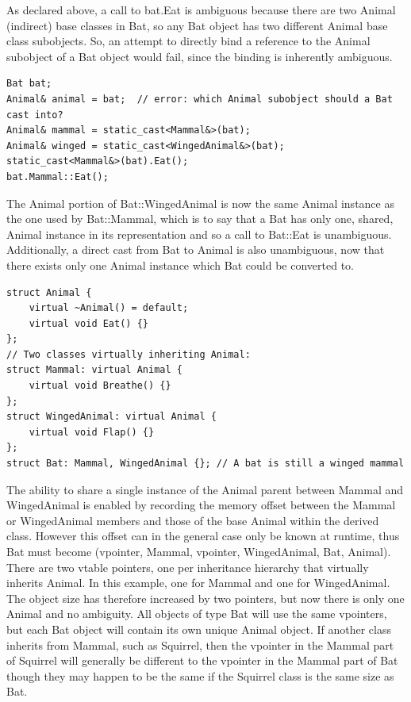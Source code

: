 \documentclass[a4paper,12pt,notitlepage]{article}
\begin{document}
As declared above, a call to bat.Eat is ambiguous because there are two Animal (indirect) base classes in Bat, so any Bat object has two different Animal base class subobjects. So, an attempt to directly bind a reference to the Animal subobject of a Bat object would fail, since the binding is inherently ambiguous.

\begin{verbatim}
Bat bat;
Animal& animal = bat;  // error: which Animal subobject should a Bat cast into?
Animal& mammal = static_cast<Mammal&>(bat); 
Animal& winged = static_cast<WingedAnimal&>(bat);
static_cast<Mammal&>(bat).Eat();
bat.Mammal::Eat();
\end{verbatim}

The Animal portion of Bat::WingedAnimal is now the same Animal instance as the one used by Bat::Mammal, which is to say that a Bat has only one, shared, Animal instance in its representation and so a call to Bat::Eat is unambiguous. Additionally, a direct cast from Bat to Animal is also unambiguous, now that there exists only one Animal instance which Bat could be converted to.

\begin{verbatim}
struct Animal {
    virtual ~Animal() = default;
    virtual void Eat() {}
};
// Two classes virtually inheriting Animal:
struct Mammal: virtual Animal {
    virtual void Breathe() {}
};
struct WingedAnimal: virtual Animal {
    virtual void Flap() {}
};
struct Bat: Mammal, WingedAnimal {}; // A bat is still a winged mammal
\end{verbatim}

The ability to share a single instance of the Animal parent between Mammal and WingedAnimal is enabled by recording the memory offset between the Mammal or WingedAnimal members and those of the base Animal within the derived class. However this offset can in the general case only be known at runtime, thus Bat must become (vpointer, Mammal, vpointer, WingedAnimal, Bat, Animal). There are two vtable pointers, one per inheritance hierarchy that virtually inherits Animal. In this example, one for Mammal and one for WingedAnimal. The object size has therefore increased by two pointers, but now there is only one Animal and no ambiguity. All objects of type Bat will use the same vpointers, but each Bat object will contain its own unique Animal object. If another class inherits from Mammal, such as Squirrel, then the vpointer in the Mammal part of Squirrel will generally be different to the vpointer in the Mammal part of Bat though they may happen to be the same if the Squirrel class is the same size as Bat. 
\end{document}
